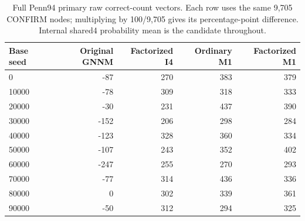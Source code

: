 \begin{table}[t]
\centering\footnotesize\setlength{\tabcolsep}{3pt}
\caption{Penn94 internal shared4 probability mean minus each primary reference, in percentage points. All four contrasts are required.}
\label{tab:penn-inference-v5}
\end{table}
\begin{table}[t]
\centering\footnotesize\setlength{\tabcolsep}{3pt}
\caption{Full Penn94 primary raw correct-count vectors. Each row uses the same 9,705 CONFIRM nodes; multiplying by 100/9,705 gives its percentage-point difference. Internal shared4 probability mean is the candidate throughout.}
\label{tab:penn-vectors-v5}
\begin{tabular}{lrrrr}
\toprule
Base seed & Original GNNM & Factorized I4 & Ordinary M1 & Factorized M1\\
\midrule
0 & -87 & 270 & 383 & 379\\
10000 & -78 & 309 & 318 & 333\\
20000 & -30 & 231 & 437 & 390\\
30000 & -152 & 206 & 298 & 284\\
40000 & -123 & 328 & 360 & 334\\
50000 & -107 & 243 & 352 & 402\\
60000 & -247 & 255 & 270 & 293\\
70000 & -77 & 314 & 436 & 336\\
80000 & 0 & 302 & 339 & 361\\
90000 & -50 & 312 & 294 & 325\\
\bottomrule
\end{tabular}
\end{table}

